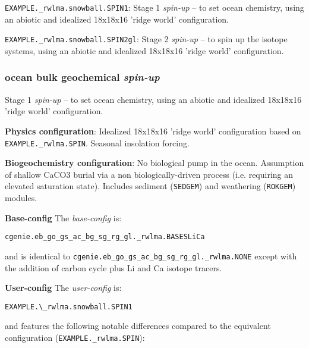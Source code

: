 \documentclass[10pt,twoside]{article}
\begin{document}
        \begin{compactenum}
                        
                \item \texttt{EXAMPLE.\_rwlma.snowball.SPIN1}: Stage 1 \textit{spin-up} -- to set ocean chemistry, using an abiotic and idealized 18x18x16 'ridge world' configuration.
                        
                \item \texttt{EXAMPLE.\_rwlma.snowball.SPIN2gl}: Stage 2 \textit{spin-up} -- to spin up the isotope systems, using an abiotic and idealized 18x18x16 'ridge world' configuration.                 
                                
        \end{compactenum}


\subsubsection{ocean bulk geochemical \textit{spin-up}}\label{EXAMPLE.rwlma.snowball.SPIN1}

Stage 1 \textit{spin-up} -- to set ocean chemistry, using an abiotic and idealized 18x18x16 'ridge world' configuration.

\noindent \textbf{Physics configuration}: Idealized 18x18x16 'ridge world' configuration based on \texttt{EXAMPLE.\_rwlma.SPIN}. Seasonal insolation forcing.

\noindent \textbf{Biogeochemistry configuration}: No biological pump in the ocean. Assumption of shallow CaCO3 burial via a non biologically-driven process (i.e. requiring an elevated saturation state). Includes sediment (\texttt{SEDGEM}) and weathering (\texttt{ROKGEM}) modules.

\noindent \textbf{Base-config} The \textit{base-config} is:
\vspace{-10pt}\begin{verbatim}cgenie.eb_go_gs_ac_bg_sg_rg_gl._rwlma.BASESLiCa\end{verbatim}\vspace{-10pt}
and is identical to \texttt{cgenie.eb\_go\_gs\_ac\_bg\_sg\_rg\_gl.\_rwlma.NONE} except with the addition of carbon cycle plus Li and Ca isotope tracers.

\noindent \textbf{User-config} The \textit{user-config} is:
\vspace{-10pt}\begin{verbatim}EXAMPLE.\_rwlma.snowball.SPIN1\end{verbatim}\vspace{-10pt}
and features the following notable differences compared to the equivalent configuration (\texttt{EXAMPLE.\_rwlma.SPIN}):
\end{document}
